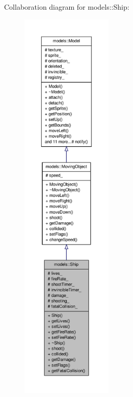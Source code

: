 \-Collaboration diagram for models\-:\-:\-Ship\-:\nopagebreak
\begin{figure}[H]
\begin{center}
\leavevmode
\includegraphics[height=550pt]{d4/d0a/classmodels_1_1Ship__coll__graph}
\end{center}
\end{figure}

